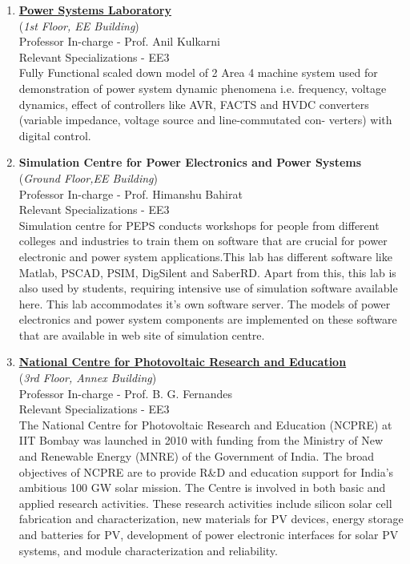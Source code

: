 \documentclass[openany]{book} %
\begin{document}
\begin{enumerate}
\item \href{https://www.ee.iitb.ac.in/web/research/labs/powersys} {\color{blue} \textbf{Power Systems Laboratory}}\\
    (\textit{1st Floor, EE Building})\\
Professor In-charge - Prof. Anil Kulkarni\\
Relevant Specializations - EE3\\
Fully Functional scaled down model of 2 Area 4 machine system used for demonstration of power
system dynamic phenomena i.e. frequency, voltage dynamics, effect of controllers like AVR,
FACTS and HVDC converters (variable impedance, voltage source and line-commutated con-
verters) with digital control.

\item  \textbf{Simulation Centre for Power Electronics and Power Systems}\\
    (\textit{Ground Floor,EE Building})\\
    Professor In-charge - Prof. Himanshu Bahirat\\
Relevant Specializations - EE3\\
Simulation centre for PEPS conducts workshops for people from different colleges and industries to train them on software that are crucial for power electronic and power system applications.This lab has different software like Matlab, PSCAD, PSIM, DigSilent and SaberRD. Apart from
this, this lab is also used by students, requiring intensive use of simulation software available here. This lab accommodates it's own software server. The models of power electronics and power system components are implemented on these software that are available in web site of simulation
centre.\\


\item \href{http://www.ncpre.iitb.ac.in/index.html} {\color{blue} \textbf{National Centre for Photovoltaic Research and Education}}\\
    (\textit{3rd Floor, Annex Building})\\
    Professor In-charge - Prof. B. G. Fernandes\\
Relevant Specializations - EE3\\
The National Centre for Photovoltaic Research and Education (NCPRE) at IIT Bombay was launched in 2010 with funding from the Ministry of New and Renewable Energy (MNRE) of the Government of India. The broad objectives of NCPRE are to provide R\&D and education support
for India’s ambitious 100 GW solar mission. The Centre is involved in both basic and applied research activities. These research activities include silicon solar cell fabrication and characterization, new materials for PV devices, energy storage and batteries for PV, development of power
electronic interfaces for solar PV systems, and module characterization and reliability.\\



\end{enumerate}
\end{document}
